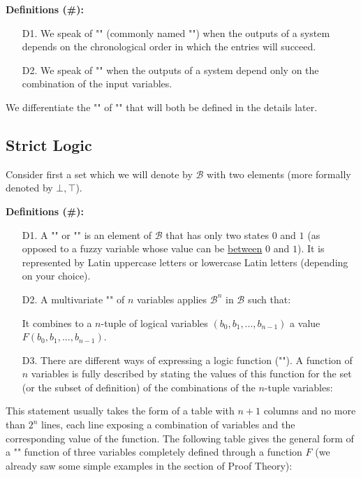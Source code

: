 	\textbf{Definitions (\#\mydef):}
	\begin{enumerate}
		\item[D1.] We speak of "" (commonly named "") when the outputs of a system depends on the chronological order in which the entries will succeed.
		
		\item[D2.] We speak of "" when the outputs of a system depend only on the combination of the input variables.
	\end{enumerate}
	\begin{tcolorbox}[title=Remark,colframe=black,arc=10pt]
	We differentiate the "" of "" that will both  be defined in the details later.
	\end{tcolorbox}
	
	\subsection{Strict Logic}
	Consider first a set which we will denote by $\mathcal{B}$ with two elements (more formally denoted by $\bot,\top$).
	
	\textbf{Definitions (\#\mydef):}
	\begin{enumerate}
		\item[D1.] A "" or "" is an element of $\mathcal{B}$ that has only two states $0$ and $1$ (as opposed to a fuzzy variable whose value can be \underline{between} $0$ and $1$). It is represented by Latin uppercase letters or lowercase Latin letters (depending on your choice).
		
		\item[D2.] A multivariate "" of $n$ variables applies $\mathcal{B}^n$ in $\mathcal{B}$ such that:
		
		It combines to a $n$-tuple of logical variables $(b_0,b_1,...,b_{n-1})$ a value $F(b_0,b_1,...,b_{n-1})$.
		
		\item[D3.] There are different ways of expressing a logic function (""). A function of $n$ variables is fully described by stating the values of this function for the set (or the subset of definition) of the combinations of the $n$-tuple variables:
		
	\end{enumerate}
	This statement usually takes the form of a table with $n + 1$ columns and no more than $2^n$ lines, each line exposing a combination of variables and the corresponding value of the function. The following table gives the general form of a "" function of three variables completely defined through a function $F$ (we already saw some simple examples in the section of Proof Theory):
	
